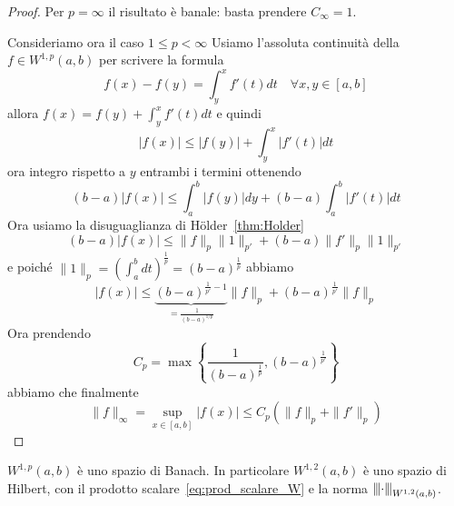 \begin{proof}
    Per \(p = \infty\) il risultato è banale: basta prendere \(C_\infty = 1\).

    Consideriamo ora il caso \(1 \le p < \infty\) 
    Usiamo l'assoluta continuità della \(f \in W^{1,p}{(a,b)}\) per scrivere la
    formula
    \begin{equation}\label{help:fond_calcolo_xy}
    f{(x)} - f{(y)} = \int_{y} ^{x} f'{(t)}dt \quad \forall x, y \in [a,b]
    \end{equation}
    allora \(f{(x)} = f{(y)} + \int_y^{x}f'{(t)}dt\) e quindi
\[
    |f{(x)}| \le  |f{(y)}| +\int_y^{x} |f'{(t)}| dt
\]
    ora integro rispetto a \(y\) entrambi i termini ottenendo
\[
    {(b-a)}|f{(x)}| \le \int_a^{b} |f{(y)}|dy + (b-a)\int_a^{b} |f'{(t)}|dt
\]
    Ora usiamo la disuguaglianza di Hölder~\ref{thm:Holder}
\[
    {(b-a)}|f{(x)}| \le \|f\|_p \|1\|_{p'} + {(b-a)}\|f'\|_p \|1\|_{p'} 
\]
    e poiché \(\|1\|_p = {\left( \int_a^{b}dt \right)}^{\frac{1}{p}} =
    {(b-a)}^{\frac{1}{p}} \)  abbiamo
\[
    |f{(x)}| \le \underbrace{{(b-a)}^{\frac{1}{p'} - 1}}_{=
    \frac{1}{{(b-a)}^{1 / p}}}  \|f\|_p +
    {(b-a)}^{\frac{1}{p'}} \|f\|_p
\]
    Ora prendendo
\[
    C_p = \max \left\{ \frac{1}{{(b-a)}^{\frac{1}{p}}}, {(b-a)}^{\frac{1}{p'}}\right\} 
\]
    abbiamo che finalmente
\[
    \|f\|_\infty = \sup_{x \in [a,b]} |f{(x)}| \le C_p {\left( \|f\|_p + \|f'\|_p \right)} 
\]
\end{proof}
\begin{theorem}[Completezza di \(W^{1,p}(a,b)\)]\label{th:w1p-banach}
    \(W^{1,p}{(a,b)}\) è uno spazio di Banach. In particolare \(W^{1,2}{(a,b)}\)
    è uno spazio di Hilbert, con il prodotto scalare~\eqref{eq:prod_scalare_W} e
    la norma \hyperlink{3norm}{\(\left\lvert\hspace{-1 pt}\left\lvert\hspace{-1 pt}\left\lvert\cdot \right\lvert\hspace{-1 pt}\right\lvert\hspace{-1 pt}\right\lvert_{W^{1,2}{(a,b)}}\)}.
\end{theorem}
